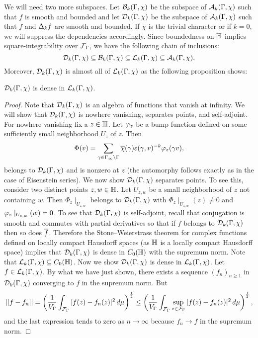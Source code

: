     We will need two more subspaces. Let $\mathcal{B}_{k}(\Gamma,\chi)$ be the subspace of $\mathcal{A}_{k}(\Gamma,\chi)$ such that $f$ is smooth and bounded and let $\mathcal{D}_{k}(\Gamma,\chi)$ be the subspace of $\mathcal{A}_{k}(\Gamma,\chi)$ such that $f$ and $\Delta_{k}f$ are smooth and bounded. If $\chi$ is the trivial character or if $k = 0$, we will suppress the dependencies accordingly. Since boundedness on $\mathbb{H}$ implies square-integrability over $\mathcal{F}_{\Gamma}$, we have the following chain of inclusions:
    \[
      \mathcal{D}_{k}(\Gamma,\chi) \subseteq \mathcal{B}_{k}(\Gamma,\chi) \subseteq \mathcal{L}_{k}(\Gamma,\chi) \subseteq \mathcal{A}_{k}(\Gamma,\chi).
    \]
    Moreover, $\mathcal{D}_{k}(\Gamma,\chi)$ is almost all of $\mathcal{L}_{k}(\Gamma,\chi)$ as the following proposition shows:

    \begin{proposition}\label{prop:dense_subspace_of_square-integrable_modular_functions}
      $\mathcal{D}_{k}(\Gamma,\chi)$ is dense in $\mathcal{L}_{k}(\Gamma,\chi)$.
    \end{proposition}
    \begin{proof}
      Note that $\mathcal{D}_{k}(\Gamma,\chi)$ is an algebra of functions that vanish at infinity. We will show that $\mathcal{D}_{k}(\Gamma,\chi)$ is nowhere vanishing, separates points, and self-adjoint. For nowhere vanishing fix a $z \in \mathbb{H}$. Let $\varphi_{z}$ be a bump function defined on some sufficiently small neighborhood $U_{z}$ of $z$. Then
      \[
        \Phi(v) = \sum_{\gamma \in \Gamma_{\infty}\backslash\Gamma}\overline{\chi}(\gamma)\varepsilon(\gamma,v)^{-k}\varphi_{z}(\gamma v),
      \]
      belongs to $\mathcal{D}_{k}(\Gamma,\chi)$ and is nonzero at $z$ (the automorphy follows exactly as in the case of Eisenstein series). We now show $\mathcal{D}_{k}(\Gamma,\chi)$ separates points. To see this, consider two distinct points $z,w \in \mathbb{H}$. Let $U_{z,w}$ be a small neighborhood of $z$ not containing $w$. Then $\Phi_{z}\mid_{U_{z,w}}$ belongs to $\mathcal{D}_{k}(\Gamma,\chi)$ with $\Phi_{z}\mid_{U_{z,w}}(z) \neq 0$ and $\varphi_{z}\mid_{U_{z,w}}(w) = 0$. To see that $\mathcal{D}_{k}(\Gamma,\chi)$ is self-adjoint, recall that conjugation is smooth and commutes with partial derivatives so that if $f$ belongs to $\mathcal{D}_{k}(\Gamma,\chi)$ then so does $\overline{f}$. Therefore the Stone–Weierstrass theorem for complex functions defined on locally compact Hausdorff spaces (as $\mathbb{H}$ is a locally compact Hausdorff space) implies that $\mathcal{D}_{k}(\Gamma,\chi)$ is dense in $C_{0}(\mathbb{H})$ with the supremum norm. Note that $\mathcal{L}_{k}(\Gamma,\chi) \subseteq C_{0}(\mathbb{H})$. Now we show $\mathcal{D}_{k}(\Gamma,\chi)$ is dense in $\mathcal{L}_{k}(\Gamma,\chi)$. Let $f \in \mathcal{L}_{k}(\Gamma,\chi)$. By what we have just shown, there exists a sequence $(f_{n})_{n \ge 1}$ in $\mathcal{D}_{k}(\Gamma,\chi)$ converging to $f$ in the supremum norm. But 
      \[
        ||f-f_{n}|| = \left(\frac{1}{V_{\Gamma}}\int_{\mathcal{F}_{\Gamma}}|f(z)-f_{n}(z)|^{2}\,d\mu\right)^{\frac{1}{2}} \le \left(\frac{1}{V_{\Gamma}}\int_{\mathcal{F}_{\Gamma}}\sup_{z \in \mathcal{F}_{\Gamma}}|f(z)-f_{n}(z)|^{2}\,d\mu\right)^{\frac{1}{2}},
      \]
      and the last expression tends to zero as $n \to \infty$ because $f_{n} \to f$ in the supremum norm.
    \end{proof}

